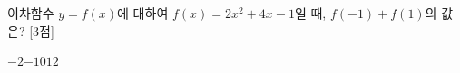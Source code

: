 이차함수 $y=f(x)$에 대하여 $f(x)=2x^2+4x-1$일 때, $f(-1)+f(1)$의 값은? \mbox{[3점]}
\begin{choices32}{$-2$}{$-1$}{$0$}{$1$}{$2$}\end{choices32}
